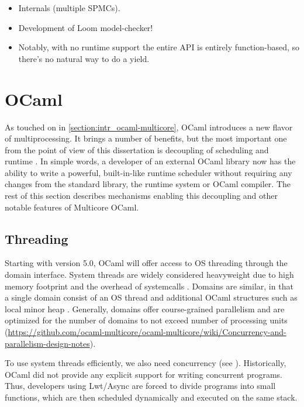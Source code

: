 \documentclass[12pt,a4paper,twoside]{report}
\begin{document}
\begin{itemize}
    \item Internals (multiple SPMCs).
    \item Development of Loom model-checker!
    \item Notably, with no runtime support the entire API is entirely function-based, so there's no natural way to do a yield. 
\end{itemize}


\section{OCaml}
\label{section:background_ocaml}

As touched on in \ref{section:intr_ocaml-multicore}, OCaml introduces a new flavor of multiprocessing. It brings a number of benefits, but the most important one from the point of view of this dissertation is decoupling of scheduling and runtime \cite{stephen_effective_nodate}. In simple words, a developer of an external OCaml library now has the ability to write a powerful, built-in-like runtime scheduler without requiring any changes from the standard library, the runtime system or OCaml compiler. The rest of this section describes mechanisms enabling this decoupling and other notable features of Multicore OCaml.

\subsection{Threading}
\label{section:fibers}
Starting with version 5.0, OCaml will offer access to OS threading through the domain interface. System threads are widely considered heavyweight due to high memory footprint and the overhead of systemcalls . Domains are similar, in that a single domain consist of an OS thread and additional OCaml structures such as local minor heap \cite{Sivaramakrishnan2020}. Generally, domains offer course-grained parallelism and are optimized for the number of domains to not exceed number of processing units (\url{https://github.com/ocaml-multicore/ocaml-multicore/wiki/Concurrency-and-parallelism-design-notes}).

To use system threads efficiently, we also need concurrency (see ). Historically, OCaml did not provide any explicit support for writing concurrent programs. Thus, developers using Lwt/Async are forced to divide programs into small functions, which are then scheduled dynamically and executed on the same stack. 
\end{document}
